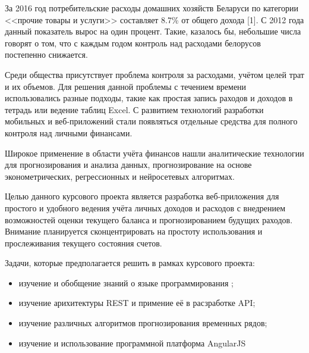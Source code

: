
За 2016 год потребительские расходы домашних хозяйств Беларуси по категории 
<<прочие товары и услуги>> составляет 8.7\% от общего дохода [1]. С 2012 года данный показатель
вырос на один процент. Такие, казалось бы, небольшие числа говорят о том, что с каждым годом
контроль над расходами белорусов постепенно снижается.

Среди общества присутствует проблема контроля за расходами, учётом целей трат и их 
объемов. Для решения данной проблемы с течением времени использовались разные подходы, 
такие как простая запись раходов и доходов в тетрадь или ведение таблиц Excel.
С развитием технологий разработки мобильных и веб-приложений стали появляться отдельные 
средства для полного контроля над личными финансами.

Широкое применение в области учёта финансов нашли аналитические технологии для прогнозирования
и анализа данных, прогнозирование на основе эконометрических, регрессионных и нейросетевых
алгоритмах.

Целью данного курсового проекта является разработка веб-приложения для простого и удобного 
ведения учёта личных доходов и расходов с внедрением возможностей оценки текущего баланса
и прогнозированием будущих раходов. Внимание планируется сконцентрировать на простоту 
использования и прослеживания текущего состояния счетов.

Задачи, которые предполагается решить в рамках курсового проекта:
\begin{itemize}
	\item изучение и обобщение знаний о языке программирования \kt{};
	\item изучение арихитектуры REST и примение её в расзработке API;
	\item изучение различных алгоритмов прогнозирования временных рядов;
	\item изучение и использование программной платформа AngularJS
\end{itemize}
